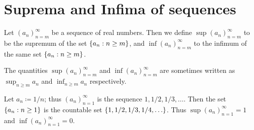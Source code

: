 \section{Suprema and Infima of sequences}\label{sec:6.3}

\begin{defn}\label{6.3.1}
  Let \((a_n)_{n = m}^\infty\) be a sequence of real numbers.
  Then we define \(\sup(a_n)_{n = m}^\infty\) to be the supremum of the set \(\left\lbrace a_n : n \geq m\right\rbrace\), and \(\inf(a_n)_{n = m}^\infty\) to the infimum of the same set \(\left\lbrace a_n : n \geq m\right\rbrace\).
\end{defn}

\begin{rmk}\label{6.3.2}
  The quantities \(\sup(a_n)_{n = m}^\infty\) and \(\inf(a_n)_{n = m}^\infty\) are sometimes written as \(\sup_{n \geq m} a_n\) and \(\inf_{n \geq m} a_n\) respectively.
\end{rmk}

\setcounter{thm}{3}
\begin{eg}\label{6.3.4}
  Let \(a_n \coloneqq 1 / n\);
  thus \((a_n)_{n = 1}^\infty\) is the sequence \(1, 1 / 2, 1 / 3, \dots\).
  Then the set \(\left\lbrace a_n : n \geq 1\right\rbrace\) is the countable set \(\set{1, 1 / 2, 1 / 3, 1 / 4, \dots}\).
  Thus \(\sup(a_n)_{n = 1}^\infty = 1\) and \(\inf(a_n)_{n = 1}^\infty = 0\).
\end{eg}

